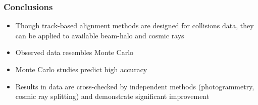 \documentclass[compress]{beamer}
\begin{document}
\begin{frame}
\frametitle{Conclusions}

\begin{itemize}\setlength{\itemsep}{0.5 cm}
\item Though track-based alignment methods are designed for collisions
  data, they can be applied to available beam-halo and cosmic rays

\item Observed data resembles Monte Carlo

\item Monte Carlo studies predict high accuracy

\item Results in data are cross-checked by independent methods
  (photogrammetry, cosmic ray splitting) and demonstrate significant
  improvement
\end{itemize}

\label{numpages}
\end{frame}
\end{document}
